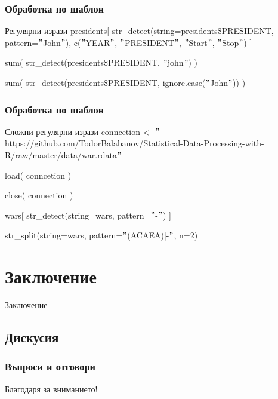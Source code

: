 \documentclass{beamer}
\begin{document}
\begin{frame}
\frametitle{Обработка по шаблон}
\begin{block}{Регулярни изрази}
presidents[ str\_detect(string=presidents\$PRESIDENT, pattern=$"$John$"$), c($"$YEAR$"$, $"$PRESIDENT$"$, $"$Start$"$, $"$Stop$"$) ]

sum( str\_detect(presidents\$PRESIDENT, $"$john$"$) )

sum( str\_detect(presidents\$PRESIDENT, ignore.case($"$John$"$)) )
\end{block}
\end{frame}

\begin{frame}
\frametitle{Обработка по шаблон}
\begin{block}{Сложни регулярни изрази}
conncetion <- $"$https://github.com/TodorBalabanov/Statistical-Data-Processing-with-R/raw/master/data/war.rdata$"$

load( conncetion )

close( connection )

wars[ str\_detect(string=wars, pattern=$"$-$"$) ]

str\_split(string=wars, pattern=$"$(ACAEA)|-$"$, n=2)
\end{block}
\end{frame}

\section{Заключение}

\begin{frame}
\center \huge{Заключение}
\end{frame}

\subsection{Дискусия}

\begin{frame}
\frametitle{Въпроси и отговори}
\center \huge{Благодаря за вниманието!}
\end{frame}
\end{document}
